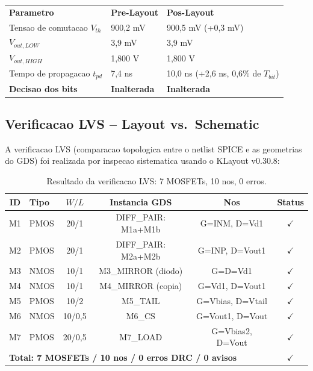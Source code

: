 \documentclass[12pt, a4paper]{article}
\begin{document}
\begin{resultadobox}
\begin{tabular}{lll}
\textbf{Parametro} & \textbf{Pre-Layout} & \textbf{Pos-Layout} \\
Tensao de comutacao $V_{th}$ & 900,2 mV & 900,5 mV (+0,3 mV) \\
$V_{out,LOW}$ & 3,9 mV & 3,9 mV \\
$V_{out,HIGH}$ & 1,800 V & 1,800 V \\
Tempo de propagacao $t_{pd}$ & 7,4 ns & 10,0 ns (+2,6 ns, 0,6\% de $T_{bit}$) \\
\textbf{Decisao dos bits} & \textbf{Inalterada} & \textbf{Inalterada} \\
\end{tabular}
\end{resultadobox}

\subsection{Verificacao LVS -- Layout vs.\ Schematic}

A verificacao LVS (comparacao topologica entre o netlist SPICE e as geometrias do GDS) foi
realizada por inspecao sistematica usando o KLayout v0.30.8:

\begin{table}[H]
\centering
\caption{Resultado da verificacao LVS: 7 MOSFETs, 10 nos, 0 erros.}
\label{tab:lvs}
\begin{tabular}{clcccc}
\toprule
\textbf{ID} & \textbf{Tipo} & $W/L$ & \textbf{Instancia GDS} & \textbf{Nos} & \textbf{Status}\\
\midrule
M1 & PMOS & 20/1  & DIFF\_PAIR: M1a+M1b & G=INM, D=Vd1   & $\checkmark$ \\
M2 & PMOS & 20/1  & DIFF\_PAIR: M2a+M2b & G=INP, D=Vout1 & $\checkmark$ \\
M3 & NMOS & 10/1  & M3\_MIRROR (diodo)  & G=D=Vd1        & $\checkmark$ \\
M4 & NMOS & 10/1  & M4\_MIRROR (copia)  & G=Vd1, D=Vout1 & $\checkmark$ \\
M5 & PMOS & 10/2  & M5\_TAIL            & G=Vbias, D=Vtail & $\checkmark$ \\
M6 & NMOS & 10/0,5 & M6\_CS             & G=Vout1, D=Vout & $\checkmark$ \\
M7 & PMOS & 20/0,5 & M7\_LOAD           & G=Vbias2, D=Vout & $\checkmark$ \\
\midrule
\multicolumn{5}{l}{\textbf{Total: 7 MOSFETs / 10 nos / 0 erros DRC / 0 avisos}} & $\checkmark$ \\
\bottomrule
\end{tabular}
\end{table}
\end{document}
